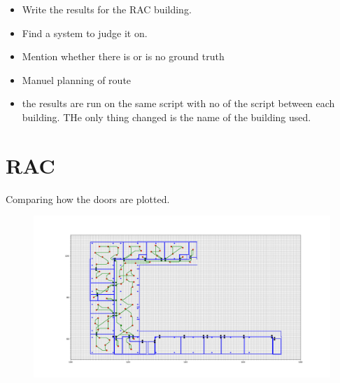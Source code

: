 
\begin{itemize}
    \item Write the results for the RAC building.
    \item Find a system to judge it on.
    \item Mention whether there is or is no ground truth
    \item Manuel planning of route
    \item the results are run on the same script with no of the script between each building. THe only thing changed is the name of the building used.
\end{itemize}

\section{RAC}
Comparing how the doors are plotted.
\begin{figure}[H]
    \centering
    \includegraphics[width=1\textwidth]{fig/Resultater/Rac/-2.154_min_height_radius0.01.png}
    \label{Rum knudepu}
    \caption[Design overview]{}
\end{figure}



